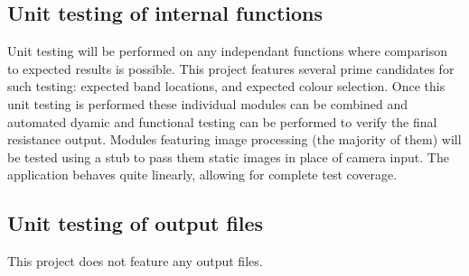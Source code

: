 \documentclass[12pt, titlepage]{article}
\begin{document}
\subsection{Unit testing of internal functions}
\par Unit testing will be performed on any independant functions where comparison to expected results is possible. This project features several prime candidates for such testing: expected band locations, and expected colour selection. Once this unit testing is performed these individual modules can be combined and automated dyamic and functional testing can be performed to verify the final resistance output. Modules featuring image processing (the majority of them) will be tested using a stub to pass them static images in place of camera input. The application behaves quite linearly, allowing for complete test coverage.
\subsection{Unit testing of output files}		
\par This project does not feature any output files.


\end{document}
